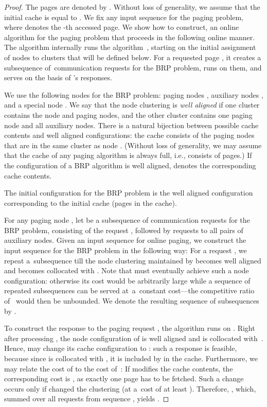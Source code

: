 \documentclass{siamart190516}
\begin{document}
\begin{proof}
The pages are denoted by . Without loss of generality, we
assume that the initial cache is equal to . We fix any
input sequence  for the
paging problem, where  denotes the -th accessed page. We show
how to construct, an online algorithm  for the paging
problem that proceeds in the following online manner. 
The algorithm internally runs the algorithm~, 
starting on the initial assignment of nodes to clusters that will be
defined below. For a requested page , it creates a subsequence
of~communication requests for the BRP problem, runs  on them, and serves
 on the basis of 's responses.

We use the following  nodes for the BRP problem: paging nodes , auxiliary nodes  , and a special node
. We say that the node clustering is \emph{well aligned} if one cluster
contains the node  and  paging nodes, and the other cluster contains
one paging node and all auxiliary nodes. There is a natural bijection between
possible cache contents and well aligned configurations: the cache consists of
the  paging nodes that are in the same cluster as node . (Without loss
of generality, we may assume that the cache of any paging algorithm is always
full, i.e., consists of  pages.) If the configuration  of a BRP
algorithm is well aligned,  denotes the corresponding cache
contents.

The initial configuration for the BRP problem is the well aligned
configuration corresponding to the initial cache (pages
 in the cache).

For any paging node , let  be a subsequence of communication
requests for the BRP problem, consisting of the request , followed by
 requests to all pairs of auxiliary nodes. Given an input
sequence  for online paging, we construct the input sequence
 for the BRP problem in the following way: For a request
, we repeat a~subsequence  till the node
clustering maintained by  becomes well aligned and  becomes
collocated with . Note that  must eventually achieve such a node
configuration: otherwise its cost would be arbitrarily large while a sequence
of repeated  subsequences can be served at~a~constant
cost---the competitive ratio of~ would then be unbounded. We denote the
resulting sequence of  subsequences by
.

To construct the response to the paging request , the algorithm
 runs  on . Right after processing
, the node configuration  of  is well aligned and
 is collocated with~. Hence,  may change its cache
configuration to : such a response is feasible, because
since  is collocated with , it is included by  in the cache.
Furthermore, we may relate the cost of  to the cost of~: If  modifies
the cache contents, the corresponding cost is , as exactly one page has to
be fetched. Such a change occurs only if  changed the clustering 
(at a~cost of at least ). Therefore, , which,
summed over all requests from sequence , yields .


\end{proof}
\end{document}
